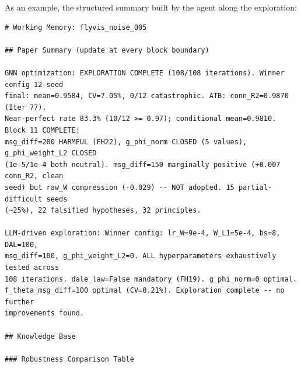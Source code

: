 
As an example, the structured summary built by the agent along the exploration:

\begin{tiny}
\begin{verbatim}
# Working Memory: flyvis_noise_005

## Paper Summary (update at every block boundary)

GNN optimization: EXPLORATION COMPLETE (108/108 iterations). Winner config 12-seed
final: mean=0.9584, CV=7.05%, 0/12 catastrophic. ATB: conn_R2=0.9870 (Iter 77).
Near-perfect rate 83.3% (10/12 >= 0.97); conditional mean=0.9810. Block 11 COMPLETE:
msg_diff=200 HARMFUL (FH22), g_phi_norm CLOSED (5 values), g_phi_weight_L2 CLOSED
(1e-5/1e-4 both neutral). msg_diff=150 marginally positive (+0.007 conn_R2, clean
seed) but raw_W compression (-0.029) -- NOT adopted. 15 partial-difficult seeds
(~25%), 22 falsified hypotheses, 32 principles.

LLM-driven exploration: Winner config: lr_W=9e-4, W_L1=5e-4, bs=8, DAL=100,
msg_diff=100, g_phi_weight_L2=0. ALL hyperparameters exhaustively tested across
108 iterations. dale_law=False mandatory (FH19). g_phi_norm=0 optimal.
f_theta_msg_diff=100 optimal (CV=0.21%). Exploration complete -- no further
improvements found.

## Knowledge Base

### Robustness Comparison Table


\end{verbatim}
\end{tiny}
